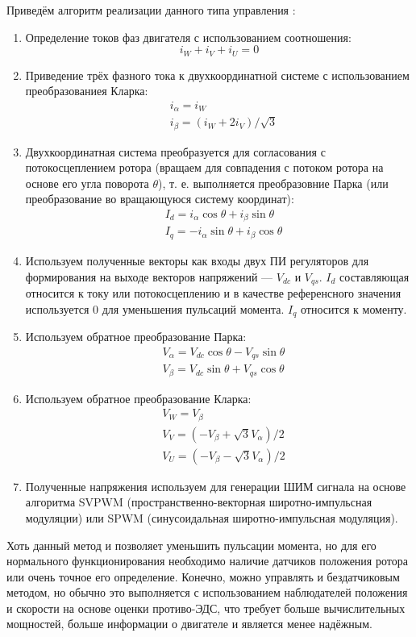 Приведём алгоритм реализации данного типа управления \cite{art:foc_control}:
\begin{enumerate}
	\item Определение токов фаз двигателя с использованием соотношения:
	\[
		i_W+i_V+i_U=0
	\]
	\item Приведение трёх фазного тока к двухкоординатной системе с использованием преобразованиея Кларка:
	\begin{align*}
		&i_{\alpha}=i_W \\
		&i_{\beta}=(i_W+2i_V)/\sqrt{3}
	\end{align*}
	\item Двухкоординатная система преобразуется для согласования с потокосцеплением ротора (вращаем для совпадения с потоком ротора на основе его угла поворота $\theta$), т. е. выполняется преобразовние Парка (или преобразование во вращающуюся систему координат):
	\begin{align*}
		&I_d=i_{\alpha}\cos\theta+i_{\beta}\sin\theta\\
		&I_q=-i_{\alpha}\sin\theta+i_{\beta}\cos\theta
	\end{align*}
	\item Используем полученные векторы как входы двух ПИ регуляторов для формирования на выходе векторов напряжений --- $V_{dc}$ и $V_{qs}$. $I_d$ составляющая относится к току или потокосцеплению и в качестве референсного значения используется $0$ для уменьшения пульсаций момента. $I_q$ относится к моменту. 
	\item Используем обратное преобразование Парка:
	\begin{align*}
		&V_{\alpha}=V_{dc}\cos\theta-V_{qs}\sin\theta \\
		&V_{\beta}=V_{dc}\sin\theta+V_{qs}\cos\theta
	\end{align*}
	\item Используем обратное преобразование Кларка:
	\begin{align*}
		&V_W=V_{\beta}\\
		&V_V=(-V_{\beta}+\sqrt{3}V_{\alpha})/2\\
		&V_U=(-V_{\beta}-\sqrt{3}V_{\alpha})/2
	\end{align*}
	\item Полученные напряжения используем для генерации ШИМ сигнала на основе алгоритма SVPWM (пространственно-векторная широтно-импульсная модуляции) или SPWM (синусоидальная широтно-импульсная модуляция).
\end{enumerate}

Хоть данный метод и позволяет уменьшить пульсации момента, но для его нормального функционирования необходимо наличие датчиков положения ротора или очень точное его определение. Конечно, можно управлять и бездатчиковым методом, но обычно это выполняется с использованием наблюдателей положения и скорости на основе оценки противо-ЭДС, что требует больше вычислительных мощностей, больше информации о двигателе и является менее надёжным.

